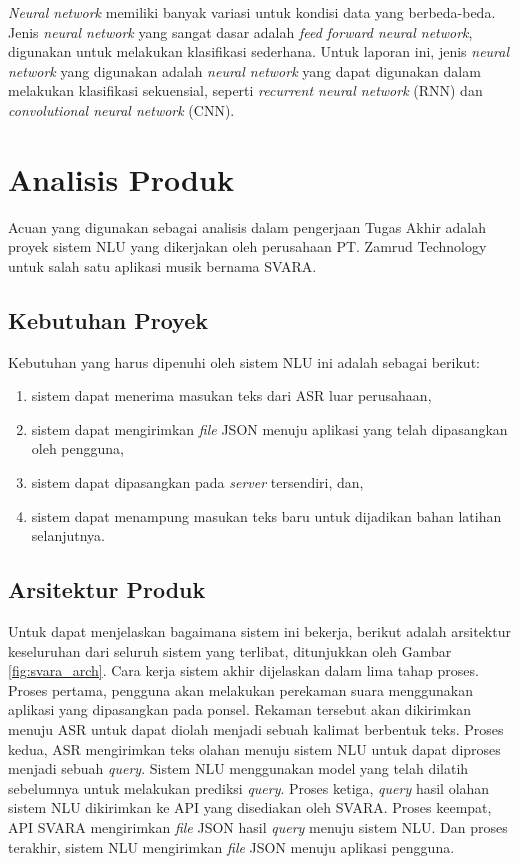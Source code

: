 \textit{Neural network} memiliki banyak variasi untuk kondisi data yang berbeda-beda. Jenis \textit{neural network} yang sangat dasar adalah \textit{feed forward neural network}, digunakan untuk melakukan klasifikasi sederhana. Untuk laporan ini, jenis \textit{neural network} yang digunakan adalah \textit{neural network} yang dapat digunakan dalam melakukan klasifikasi sekuensial, seperti \textit{recurrent neural network} (RNN) dan \textit{convolutional neural network} (CNN).

\section{Analisis Produk}

Acuan yang digunakan sebagai analisis dalam pengerjaan Tugas Akhir adalah proyek sistem NLU yang dikerjakan oleh perusahaan PT. Zamrud Technology untuk salah satu aplikasi musik bernama SVARA.

\subsection{Kebutuhan Proyek}

Kebutuhan yang harus dipenuhi oleh sistem NLU ini adalah sebagai berikut:

\begin{enumerate}
	\item sistem dapat menerima masukan teks dari ASR luar perusahaan,
	\item sistem dapat mengirimkan \textit{file} JSON menuju aplikasi yang telah dipasangkan oleh pengguna,
	\item sistem dapat dipasangkan pada \textit{server} tersendiri, dan,
	\item sistem dapat menampung masukan teks baru untuk dijadikan bahan latihan selanjutnya.
\end{enumerate}

\subsection{Arsitektur Produk}

Untuk dapat menjelaskan bagaimana sistem ini bekerja, berikut adalah arsitektur keseluruhan dari seluruh sistem yang terlibat, ditunjukkan oleh Gambar \ref{fig:svara_arch}. Cara kerja sistem akhir dijelaskan dalam lima tahap proses. Proses pertama, pengguna akan melakukan perekaman suara menggunakan aplikasi yang dipasangkan pada ponsel. Rekaman tersebut akan dikirimkan menuju ASR untuk dapat diolah menjadi sebuah kalimat berbentuk teks. Proses kedua, ASR mengirimkan teks olahan menuju sistem NLU untuk dapat diproses menjadi sebuah \textit{query}. Sistem NLU menggunakan model yang telah dilatih sebelumnya untuk melakukan prediksi \textit{query}. Proses ketiga, \textit{query} hasil olahan sistem NLU dikirimkan ke API yang disediakan oleh SVARA. Proses keempat, API SVARA mengirimkan \textit{file} JSON hasil \textit{query} menuju sistem NLU. Dan proses terakhir, sistem NLU mengirimkan \textit{file} JSON menuju aplikasi pengguna.

